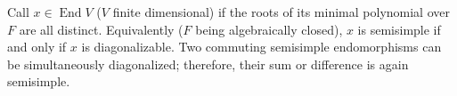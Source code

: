 Call $x \in \operatorname{End} V$ ($V$ finite dimensional)  if the roots of its minimal polynomial over $F$ are all distinct. Equivalently ($F$ being algebraically closed), $x$ is semisimple if and only if $x$ is diagonalizable. Two commuting semisimple endomorphisms can be simultaneously diagonalized; therefore, their sum or difference is again semisimple.
